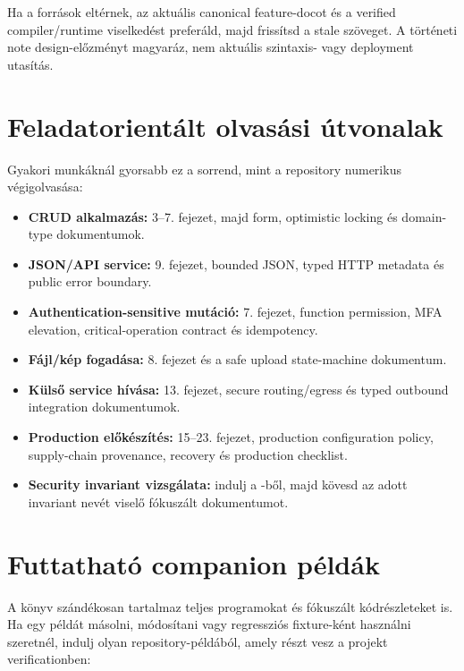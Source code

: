 Ha a források eltérnek, az aktuális canonical feature-docot és a verified compiler/runtime viselkedést preferáld, majd frissítsd a stale szöveget. A történeti note design-előzményt magyaráz, nem aktuális szintaxis- vagy deployment utasítás.

\section{Feladatorientált olvasási útvonalak}

Gyakori munkáknál gyorsabb ez a sorrend, mint a repository numerikus végigolvasása:

\begin{itemize}
  \item \textbf{CRUD alkalmazás:} 3--7. fejezet, majd form, optimistic locking és domain-type dokumentumok.
  \item \textbf{JSON/API service:} 9. fejezet, bounded JSON, typed HTTP metadata és public error boundary.
  \item \textbf{Authentication-sensitive mutáció:} 7. fejezet, function permission, MFA elevation, critical-operation contract és idempotency.
  \item \textbf{Fájl/kép fogadása:} 8. fejezet és a safe upload state-machine dokumentum.
  \item \textbf{Külső service hívása:} 13. fejezet, secure routing/egress és typed outbound integration dokumentumok.
  \item \textbf{Production előkészítés:} 15--23. fejezet, production configuration policy, supply-chain provenance, recovery és production checklist.
  \item \textbf{Security invariant vizsgálata:} indulj a -ből, majd kövesd az adott invariant nevét viselő fókuszált dokumentumot.
\end{itemize}

\section{Futtatható companion példák}

A könyv szándékosan tartalmaz teljes programokat és fókuszált kódrészleteket is. Ha egy példát másolni, módosítani vagy regressziós fixture-ként használni szeretnél, indulj olyan repository-példából, amely részt vesz a projekt verificationben:

